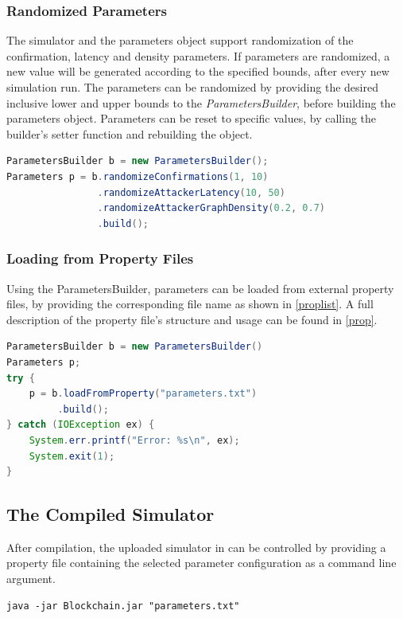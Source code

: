 \documentclass[a4paper,12pt,twoside]{report}
\begin{document}
\subsubsection{Randomized Parameters}
The simulator and the parameters object support randomization of the confirmation, latency and density parameters. If parameters are randomized, a new value will be generated according to the specified bounds, after every new simulation run. The parameters can be randomized by providing the desired inclusive lower and upper bounds to the \textit{ParametersBuilder}, before building the parameters object. Parameters can be reset to specific values, by calling the builder's setter function and rebuilding the object.
\begin{lstlisting}[language=Java, caption=Randomizing parameters using the ParametersBuilder]
ParametersBuilder b = new ParametersBuilder();
Parameters p = b.randomizeConfirmations(1, 10)
                .randomizeAttackerLatency(10, 50)
                .randomizeAttackerGraphDensity(0.2, 0.7)
                .build();
\end{lstlisting}
\subsubsection{Loading from Property Files}
Using the ParametersBuilder, parameters can be loaded from external property files, by providing the corresponding file name as shown in \autoref{proplist}. A full description of the property file's structure and usage can be found in \autoref{prop}.

\begin{lstlisting}[language=Java, caption=Loading parameters from property file,label=proplist]
ParametersBuilder b = new ParametersBuilder()
Parameters p;
try {
	p = b.loadFromProperty("parameters.txt")
	     .build();
} catch (IOException ex) {
	System.err.printf("Error: %s\n", ex);
	System.exit(1);
}
\end{lstlisting}
\subsection{The Compiled Simulator}
After compilation, the uploaded simulator in \cite{github} can be controlled by providing a property file containing the selected parameter configuration as a command line argument.
\begin{lstlisting}[caption=Launching the simulator from the command line,label=cmd]
java -jar Blockchain.jar "parameters.txt"
\end{lstlisting}
\end{document}
